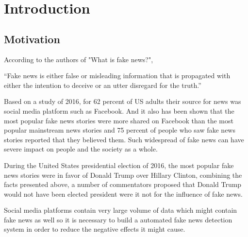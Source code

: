 \chapter{Introduction}\label{introduction}

\section{Motivation}\label{intro:motivation}
According to the authors of "What is fake news?"\cite{jasterfake}, 

\enquote{Fake news is either false or misleading information that is propagated with either the intention to deceive or an utter disregard for the truth.}

Based on a study of 2016, for 62 percent of US adults their source for news was social media platform such as Facebook\cite{gottfried2016news}. And it also has been shown that the most popular fake news stories were more shared on Facebook than the most popular mainstream news stories\cite{silverman2016analysis} and 75 percent of people who saw fake news stories reported that they believed them\cite{silverman2016most}. Such widespread of fake news can have severe impact on people and the society as a whole.\par
During the United States presidential election of 2016, the most popular fake news stories were in favor of Donald Trump over Hillary Clinton\cite{silverman2016analysis}, combining the facts presented above, a number of commentators proposed that Donald Trump would not have been elected president were it not for the influence of fake news\cite{parkinson2016click}\cite{read2016donald}\cite{dewey2016facebook}.\par
Social media platforms contain very large volume of data which might contain fake news as well so it is necessary to build a automated fake news detection system in order to reduce the negative effects it might cause.

